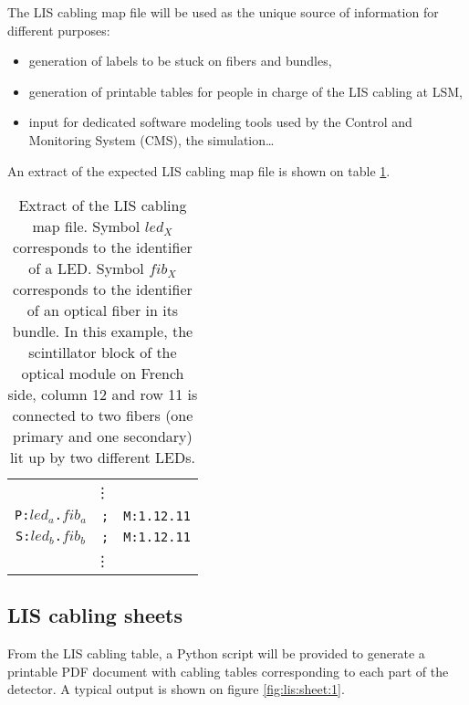 \documentclass[12pt,a4paper]{article}
\begin{document}
\par\noindent The  LIS cabling  map file  will be  used as  the unique
source of information for different purposes:
\begin{itemize}
\item generation of labels to be stuck on fibers and bundles,
\item generation of  printable tables for people in charge  of the LIS
  cabling at LSM,
\item input for dedicated software  modeling tools used by the
  Control and Monitoring System (CMS), the simulation\dots 
\end{itemize}

\par\noindent An extract of the expected LIS cabling map file is shown
on table \ref{tab:lis:map:2}.
\begin{table}[h]
  \begin{center}
    \begin{tabular}{|ccc|}
      \hline
      \multicolumn{3}{|c|}{\vdots}\\
      \texttt{P:}$led_a$\texttt{.}$fib_a$  & \texttt{;} & \texttt{M:1.12.11} \\
      \texttt{S:}$led_b$\texttt{.}$fib_b$  & \texttt{;} & \texttt{M:1.12.11} \\
      \multicolumn{3}{|c|}{\vdots}\\
      \hline
    \end{tabular}
  \end{center}
  \caption{Extract  of  the  LIS  cabling map file.   Symbol
    $led_X$ corresponds  to the identifier  of a LED.   Symbol $fib_X$
    corresponds  to  the  identifier  of   an  optical  fiber  in  its
    bundle. In  this example,  the scintillator  block of  the optical
    module on  French side, column 12  and row 11 is  connected to two
    fibers (one  primary and  one secondary) lit  up by  two different
    LEDs.}
\label{tab:lis:map:2}
\end{table}


\subsection{LIS cabling sheets}

From  the LIS  cabling  table, a  Python script  will  be provided  to
generate a printable PDF document with cabling tables corresponding to
each  part of  the  detector.  A typical  output  is  shown on  figure
\ref{fig:lis:sheet:1}.
\end{document}
